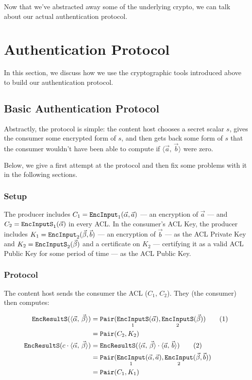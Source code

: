 \documentclass[pdftex,12pt,a4papaer,twoside,notitlepage]{report}
\newcommand{\iprod}[2]{\langle #1,\,#2\rangle}
\DeclareMathOperator{\ein}{\mathtt{EncInput}}
\DeclareMathOperator{\eins}{\mathtt{EncInputS}}
\DeclareMathOperator{\eouts}{\mathtt{EncResultS}}
\DeclareMathOperator{\pair}{\mathtt{Pair}}
\begin{document}
Now that we've abstracted away some of the underlying crypto, we can talk about
our actual authentication protocol.

\section{Authentication Protocol}

In this section, we discuss how we use the cryptographic tools introduced above
to build our authentication protocol.

\subsection{Basic Authentication Protocol}

Abstractly, the protocol is simple: the content host chooses a secret scalar
$s$, gives the consumer some encrypted form of $s$, and then gets back some form
of $s$ that the consumer wouldn't have been able to compute if
$\iprod{\vec{a}}{\vec{b}}$ were zero.

Below, we give a first attempt at the protocol and then fix some problems with
it in the following sections.

\subsubsection{Setup}

The producer includes $C_1 = \ein_1(\Ap, \vec{a})$ --- an encryption of
$\vec{a}$ --- and $C_2 = \eins_1(\Ap)$ in every ACL. In the consumer's ACL Key,
the producer includes $K_1 = \ein_2(\Bp, \vec{b})$ --- an encryption of
$\vec{b}$ --- as the ACL Private Key and $K_2 = \eins_2(\Bp)$ and a certificate
on $K_2$ --- certifying it as a valid ACL Public Key for some period of time --- as
the ACL Public Key.

\subsubsection{Protocol}

The content host sends the consumer the ACL ($C_1$, $C_2$). They (the consumer)
then computes:

\begin{align*}
  \eouts(\ABp)          &= \pair(\eins_1(\Ap), \eins_2(\Bp)) \tag{1} \\
                        &= \pair(C_2, K_2) \\
  \eouts(c \cdot \ABp)  &= \eouts(\ABp \cdot \iprod{\vec{a}}{\vec{b}}) \tag{2} \\
                        &= \pair(\ein_1(\Ap, \vec{a}), \ein_2(\Bp, \vec{b})) \\
                        &= \pair(C_1, K_1) \\
\end{align*}
\end{document}
